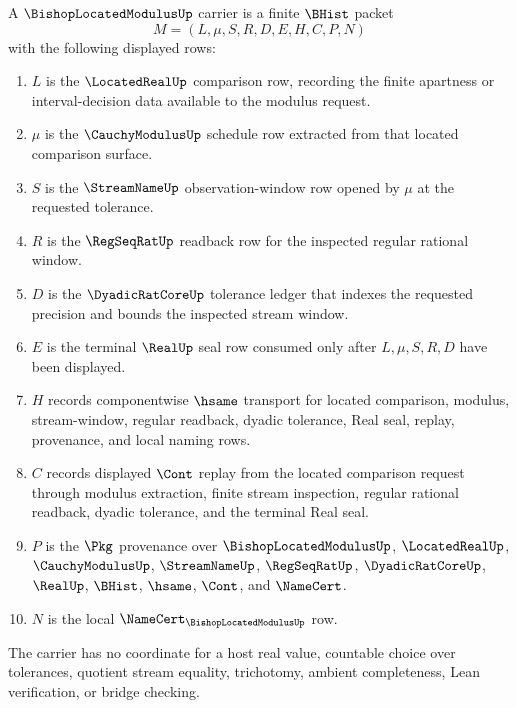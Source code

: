 \begin{definition}
\label{def:bishop-located-modulus-carrier}
A $\BishopLocatedModulusUp$ carrier is a finite $\BHist$ packet
$$
M=(L,\mu,S,R,D,E,H,C,P,N)
$$
with the following displayed rows:
\begin{enumerate}
\item $L$ is the $\LocatedRealUp$ comparison row, recording the finite apartness or interval-decision data available to the modulus request.
\item $\mu$ is the $\CauchyModulusUp$ schedule row extracted from that located comparison surface.
\item $S$ is the $\StreamNameUp$ observation-window row opened by $\mu$ at the requested tolerance.
\item $R$ is the $\RegSeqRatUp$ readback row for the inspected regular rational window.
\item $D$ is the $\DyadicRatCoreUp$ tolerance ledger that indexes the requested precision and bounds the inspected stream window.
\item $E$ is the terminal $\RealUp$ seal row consumed only after $L,\mu,S,R,D$ have been displayed.
\item $H$ records componentwise $\hsame$ transport for located comparison, modulus, stream-window, regular readback, dyadic tolerance, Real seal, replay, provenance, and local naming rows.
\item $C$ records displayed $\Cont$ replay from the located comparison request through modulus extraction, finite stream inspection, regular rational readback, dyadic tolerance, and the terminal Real seal.
\item $P$ is the $\Pkg$ provenance over $\BishopLocatedModulusUp$, $\LocatedRealUp$, $\CauchyModulusUp$, $\StreamNameUp$, $\RegSeqRatUp$, $\DyadicRatCoreUp$, $\RealUp$, $\BHist$, $\hsame$, $\Cont$, and $\NameCert$.
\item $N$ is the local $\NameCert_{\BishopLocatedModulusUp}$ row.
\end{enumerate}
The carrier has no coordinate for a host real value, countable choice over tolerances, quotient stream equality, trichotomy, ambient completeness, Lean verification, or bridge checking.
\end{definition}

